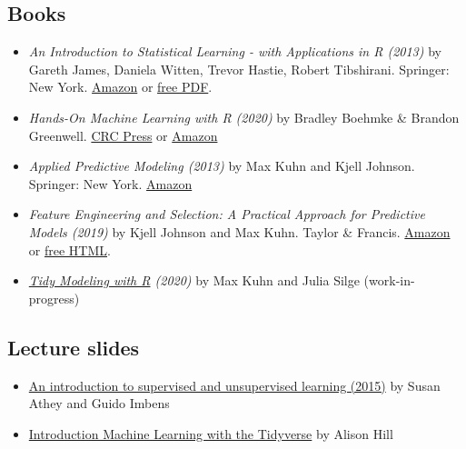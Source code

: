 \documentclass[
]{book}
\begin{document}
\hypertarget{books}{%
\subsection{Books}\label{books}}

\begin{itemize}
\item
  \emph{An Introduction to Statistical Learning - with Applications in R (2013)} by Gareth James, Daniela Witten, Trevor Hastie, Robert Tibshirani. Springer: New York. \href{https://www.amazon.com/Introduction-Statistical-Learning-Applications-Statistics/dp/1461471370}{Amazon} or \href{http://www-bcf.usc.edu/~gareth/ISL/}{free PDF}.
\item
  \emph{Hands-On Machine Learning with R (2020)} by Bradley Boehmke \& Brandon Greenwell. \href{https://www.routledge.com/Hands-On-Machine-Learning-with-R/Boehmke-Greenwell/p/book/9781138495685}{CRC Press} or \href{https://www.amazon.com/gp/product/1138495689?pf_rd_p=ab873d20-a0ca-439b-ac45-cd78f07a84d8\&pf_rd_r=JBRX0ZJ1WFSR9T3JPTQE}{Amazon}
\item
  \emph{Applied Predictive Modeling (2013)} by Max Kuhn and Kjell Johnson. Springer: New York. \href{https://www.amazon.com/Applied-Predictive-Modeling-Max-Kuhn/dp/1461468485?SubscriptionId=0ENGV10E9K9QDNSJ5C82\&tag=apm0a-20\&linkCode=xm2\&camp=2025\&creative=165953\&creativeASIN=1461468485}{Amazon}
\item
  \emph{Feature Engineering and Selection: A Practical Approach for Predictive Models (2019)} by Kjell Johnson and Max Kuhn. Taylor \& Francis. \href{http://www.feat.engineering/}{Amazon} or \href{http://www.feat.engineering/}{free HTML}.
\item
  \emph{\href{https://www.tmwr.org/}{Tidy Modeling with R} (2020)} by Max Kuhn and Julia Silge (work-in-progress)
\end{itemize}

\hypertarget{lecture-slides}{%
\subsection{Lecture slides}\label{lecture-slides}}

\begin{itemize}
\item
  \href{https://www.nber.org/econometrics_minicourse_2015/nber_slides11.pdf}{An introduction to supervised and unsupervised learning (2015)} by Susan Athey and Guido Imbens
\item
  \href{https://education.rstudio.com/blog/2020/02/conf20-intro-ml/}{Introduction Machine Learning with the Tidyverse} by Alison Hill
\end{itemize}
\end{document}
